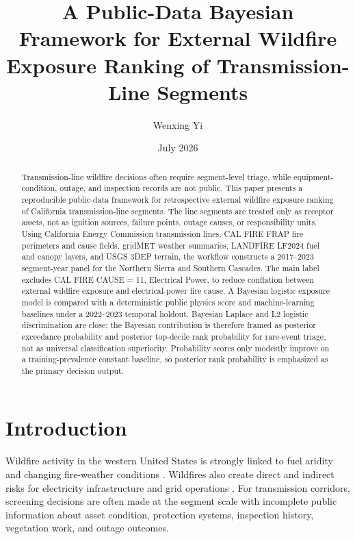 \documentclass[11pt]{article}
\title{A Public-Data Bayesian Framework for External Wildfire Exposure Ranking of Transmission-Line Segments}
\author{Wenxing Yi}
\date{July 2026}
\begin{document}
\maketitle

\begin{abstract}
Transmission-line wildfire decisions often require segment-level triage, while
equipment-condition, outage, and inspection records are not public. This paper
presents a reproducible public-data framework for retrospective external
wildfire exposure ranking of California transmission-line segments. The line
segments are treated only as receptor assets, not as ignition sources, failure
points, outage causes, or responsibility units. Using California Energy
Commission transmission lines, CAL FIRE FRAP fire perimeters and cause fields,
gridMET weather summaries, LANDFIRE LF2024 fuel and canopy layers, and USGS
3DEP terrain, the workflow constructs a 2017--2023 segment-year panel for the
Northern Sierra and Southern Cascades. The main label excludes CAL FIRE CAUSE =
11, Electrical Power, to reduce conflation between external wildfire exposure
and electrical-power fire cause. A Bayesian logistic exposure model is compared
with a deterministic public physics score and machine-learning baselines under
a 2022--2023 temporal holdout. Bayesian Laplace and L2 logistic discrimination
are close; the Bayesian contribution is therefore framed as posterior
exceedance probability and posterior top-decile rank probability for rare-event
triage, not as universal classification superiority. Probability scores only
modestly improve on a training-prevalence constant baseline, so posterior rank
probability is emphasized as the primary decision output.
\end{abstract}

\section{Introduction}

Wildfire activity in the western United States is strongly linked to fuel
aridity and changing fire-weather conditions
\citep{abatzoglouWilliams2016wildfire}. Wildfires also create direct and
indirect risks for electricity infrastructure and grid operations
\citep{dale2018californiaGrid,panossianElgindy2023wildfire}. For transmission
corridors, screening decisions are often made at the segment scale with
incomplete public information about asset condition, protection systems,
inspection history, vegetation work, and outage outcomes.
\end{document}
